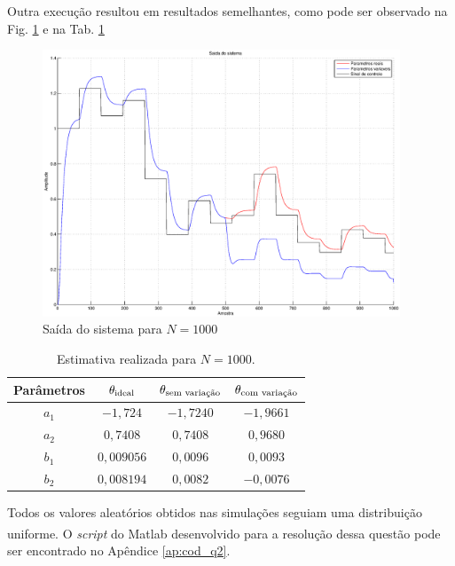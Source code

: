 Outra execução resultou em resultados semelhantes, como pode ser observado na
Fig. \ref{fig:saida_sist_1000_2} e na Tab. \ref{tab:estimativa_1000_2}

\begin{figure}[htb]
\centering
    \includegraphics[width=0.95\textwidth]{imgs/questao2/saida_1000_2}
    \caption{Saída do sistema para $N = 1000$}
    \label{fig:saida_sist_1000_2}
\end{figure}

\begin{table}
\centering
    \caption{Estimativa realizada para $N = 1000$.}
    \label{tab:estimativa_1000_2}
    \vspace{0.25cm}
    \begin{tabular}{|c|c|c|c|}
        \hline
        Parâmetros & 
        $\mathbf{\theta}_{\text{ideal}}$&
        $\mathbf{\theta}_{\text{sem variação}}$&
        $\mathbf{\theta}_{\text{com variação}}$\\
        \hline
        \hline
        $a_1$ & $-1,724$   & $-1,7240$ & $-1,9661$ \\
        \hline
        $a_2$ & $0,7408$   & $0,7408$  & $0,9680$ \\
        \hline
        $b_1$ & $0,009056$ & $0,0096$  & $0,0093$ \\
        \hline
        $b_2$ & $0,008194$ & $0,0082$  & $-0,0076$ \\
        \hline
    \end{tabular}
\end{table}

Todos os valores aleatórios obtidos nas simulações seguiam uma distribuição
uniforme. O {\it script} do Matlab\textsuperscript{\textregistered} desenvolvido
para a resolução dessa questão pode ser encontrado no Apêndice \ref{ap:cod_q2}.
